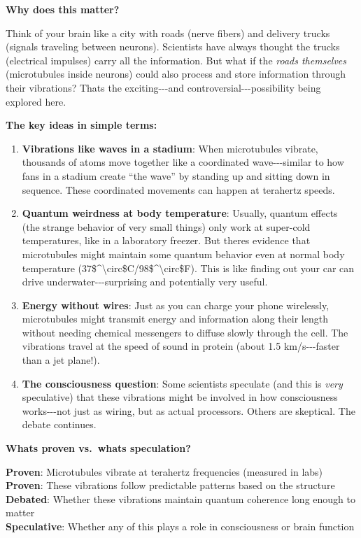 \textbf{Why does this matter?}

Think of your brain like a city with roads (nerve fibers) and delivery
trucks (signals traveling between neurons). Scientists have always
thought the trucks (electrical impulses) carry all the information. But
what if the \emph{roads themselves} (microtubules inside neurons) could
also process and store information through their vibrations?
That\textquotesingle s the exciting-\/-\/-and
controversial-\/-\/-possibility being explored here.

\textbf{The key ideas in simple terms:}

\begin{enumerate}
\def\labelenumi{\arabic{enumi}.}
\item
  \textbf{Vibrations like waves in a stadium}: When microtubules
  vibrate, thousands of atoms move together like a coordinated
  wave-\/-\/-similar to how fans in a stadium create ``the wave'' by
  standing up and sitting down in sequence. These coordinated movements
  can happen at terahertz speeds.
\item
  \textbf{Quantum weirdness at body temperature}: Usually, quantum
  effects (the strange behavior of very small things) only work at
  super-cold temperatures, like in a laboratory freezer. But
  there\textquotesingle s evidence that microtubules might maintain some
  quantum behavior even at normal body temperature
  (37\$\^{}\textbackslash circ\$C/98\$\^{}\textbackslash circ\$F). This
  is like finding out your car can drive underwater-\/-\/-surprising and
  potentially very useful.
\item
  \textbf{Energy without wires}: Just as you can charge your phone
  wirelessly, microtubules might transmit energy and information along
  their length without needing chemical messengers to diffuse slowly
  through the cell. The vibrations travel at the speed of sound in
  protein (about 1.5 km/s-\/-\/-faster than a jet plane!).
\item
  \textbf{The consciousness question}: Some scientists speculate (and
  this is \emph{very} speculative) that these vibrations might be
  involved in how consciousness works-\/-\/-not just as wiring, but as
  actual processors. Others are skeptical. The debate continues.
\end{enumerate}

\textbf{What\textquotesingle s proven vs.~what\textquotesingle s
speculation?}

\textbf{Proven}: Microtubules vibrate at terahertz frequencies (measured
in labs)\\
\textbf{Proven}: These vibrations follow predictable patterns based on
the structure\\
\textbf{Debated}: Whether these vibrations maintain quantum coherence
long enough to matter\\
\textbf{Speculative}: Whether any of this plays a role in consciousness
or brain function

